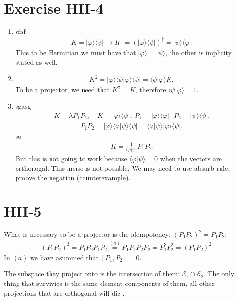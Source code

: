 \documentclass[letterpaper,11pt,twoside]{article}
\title{\textbf{\assignment}\\\course\\{\Large\institution}}
\author{\autor}
\newcommand{\ket}[1]{|#1\rangle}
\newcommand{\bra}[1]{\langle#1|}
\newcommand{\braket}[1]{\langle#1\rangle}
\newcommand{\E}{\mathscr{E}}
\begin{document}
\pagestyle{mainstyle}
\maketitle
\section*{Exercise HII-4}
\begin{enumerate}
  \item sfaf
  \begin{align*}
    K=\ket{\varphi}\bra{\psi}\longrightarrow K^\dagger=(\ket{\varphi}\bra{\psi})^\dagger=\ket{\psi}\bra{\varphi}.
  \end{align*}
  This to be Hermitian we must have that $\ket{\varphi}=\ket{\psi}$, the other is implicity stated as well.
  \item
  \begin{align*}
    K^2=\ket{\varphi}\braket{\psi|\varphi}\bra{\psi}=\braket{\psi|\varphi}K,
  \end{align*}
  To be a projector, we need that $K^2=K$, therefore $\braket{\psi|\varphi}=1$.
  \item sgasg
  \begin{align*}
    K=\lambda P_1P_2,\quad K=\ket{\varphi}\bra{\psi},\;P_1=\ket{\varphi}\bra{\varphi},\;P_2=\ket{\psi}\bra{\psi}.
  \end{align*}
  \begin{align*}
    P_1P_2=\ket{\varphi}\braket{\varphi|\psi}\bra{\psi}=\braket{\varphi|\psi}\ket{\varphi}\bra{\psi},
  \end{align*}
  so 
  \begin{align*}
    K=\frac{1}{\braket{\varphi|\psi}}P_1P_2.
  \end{align*}
  But this is not going to work because $\braket{\varphi|\psi}=0$ when the vectors are orthonogal.
  This incise is not possible. We may need to use absurb rule: proove the negation (counterexample).
\end{enumerate}
\section*{HII-5}
What is necessary to be a projector is the idempotency: $(P_1P_2)^2=P_1P_2$:
\begin{align*}
  (P_1P_2)^2=P_1P_2P_1P_2\stackrel{(a)}{=}P_1P_1P_2P_2=P_1^2P_2^2=(P_1P_2)^2
\end{align*}
In $(a)$ we have asummed that $[P_1,P_2]=0$.

The subspace they project onto is the intersection of them: $\E_1\cap\E_2$. The only thing that survivies is the 
same element components of them, all other projections that are orthogonal will die .
\end{document}
